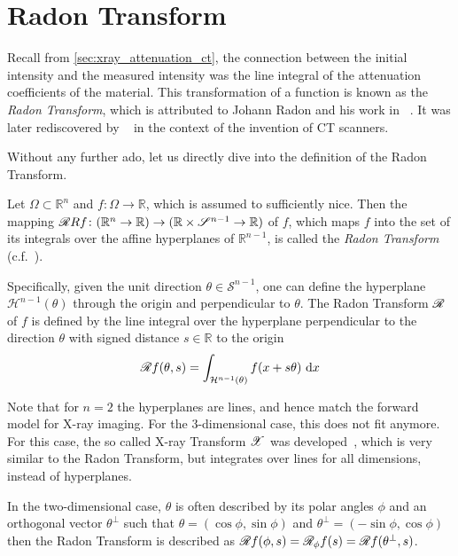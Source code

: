 \section{Radon Transform}\label{sec:radon_transform}

Recall from \autoref{sec:xray_attenuation_ct}, the connection between the initial intensity and the
measured intensity was the line integral of the attenuation coefficients of the material. This
transformation of a function is known as the \textit{Radon Transform}, which is attributed to Johann
Radon and his work in \citeyear{radon_uber_1917}~\cite{radon_uber_1917,radon_determination_1986}. It
was later rediscovered by
\citeauthor{cormack_representation_1963}~\cite{cormack_representation_1963} in the context of the
invention of CT scanners.

Without any further ado, let us directly dive into the definition of the Radon Transform.

\begin{definition}
	Let \(\Omega \subset \mathbb{R}^n\) and \(f\colon \Omega \to \mathbb{R}\), which is assumed
	to sufficiently nice. Then the mapping \(\radon{R}f\colon (\mathbb{R}^n \to \mathbb{R})
	\to (\mathbb{R} \times \mathscr{S}^{n-1} \to \mathbb{R})\) of \(f\), which maps \(f\) into
	the set of its integrals over the affine hyperplanes of \(\mathbb{R}^{n-1}\), is called the
	\textit{Radon Transform} (c.f.~\cite{natterer_mathematics_1986,buzug_computed_2008}).

\end{definition}
Specifically, given the unit direction \(\theta \in \mathcal{S}^{n-1}\), one can define the
hyperplane \(\mathcal{H}^{n-1}(\theta)\) through the origin and perpendicular to \(\theta\).
The Radon Transform \(\mathscr{R}\) of \(f\) is defined by the line integral over the
hyperplane perpendicular to the direction \(\theta\) with signed distance \(s \in
\mathbb{R}\) to the origin
\[ \mathscr{R} f(\theta, s) = \int_{\mathcal{H}^{n-1}(\theta)} f(x + s\theta) \, \, \mathrm{d}x \]

Note that for \(n=2\) the hyperplanes are lines, and hence match the forward model for X-ray
imaging. For the 3-dimensional case, this does not fit anymore. For this case, the so called X-ray
Transform \(\mathscr{X}\) was developed~\cite{solmon_x-ray_1976}, which is very similar to the Radon
Transform, but integrates over lines for all dimensions, instead of hyperplanes.

In the two-dimensional case, \(\theta\) is often described by its polar angles \(\phi\) and an
orthogonal vector \(\theta^\perp\) such that
\( \theta = (\cos \phi, \sin \phi)\) and \(\theta^\perp = (-\sin\phi, \cos\phi)\)
then the Radon Transform is described as \( \mathscr{R} f(\phi, s) = \mathscr{R}_\phi f(s) = \mathscr{R} f(\theta^\perp, s)\).

